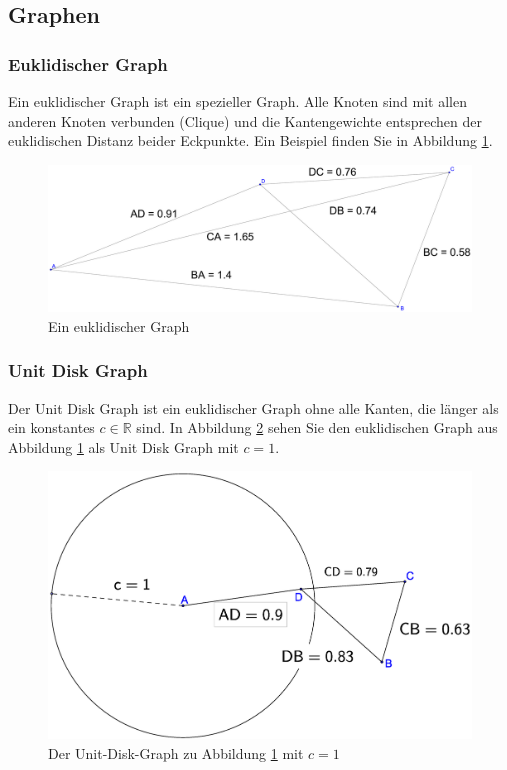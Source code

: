 \documentclass[a4paper,twoside]{IEEEtran}
\begin{document}



\subsection{Graphen}
\subsubsection{Euklidischer Graph}
Ein euklidischer Graph ist ein spezieller Graph. 
Alle Knoten sind mit allen anderen Knoten verbunden (Clique) und die Kantengewichte entsprechen der euklidischen Distanz beider Eckpunkte. 
Ein Beispiel finden Sie in Abbildung \ref{fig:Graph}.
\begin{figure}[h!]
\centering
\includegraphics[width=0.99\linewidth]{Graph.eps}
\caption{Ein euklidischer Graph}
\label{fig:Graph}
\end{figure}
\subsubsection{Unit Disk Graph}
Der Unit Disk Graph ist ein euklidischer Graph ohne alle Kanten, die länger als ein konstantes $c \in \mathds{R} $ sind.
In Abbildung \ref{fig:UnitGraph} sehen Sie den euklidischen Graph aus Abbildung \ref{fig:Graph} als Unit Disk Graph mit $c = 1 $.
\begin{figure}[h!]
\centering
\includegraphics[width=0.99\linewidth]{UnitGraph.eps}
\caption{Der Unit-Disk-Graph zu Abbildung \ref{fig:Graph} mit $c = 1 $}
\label{fig:UnitGraph}
\end{figure}
\end{document}

